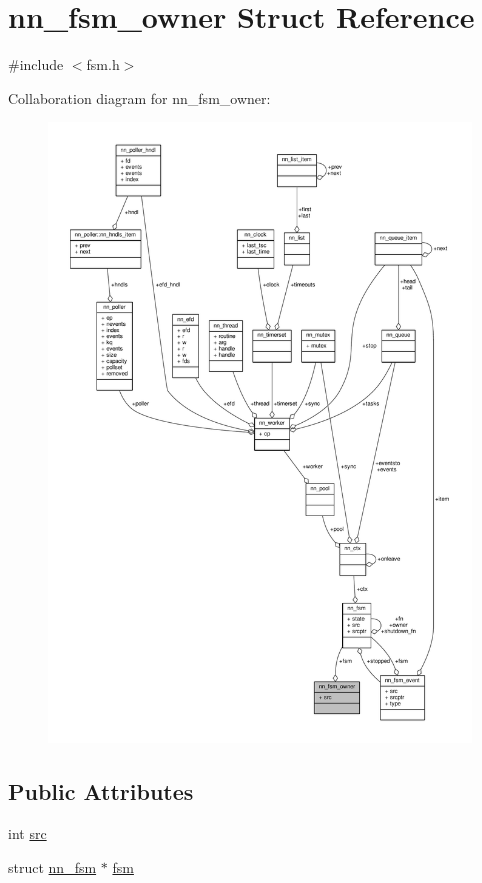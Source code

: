\hypertarget{structnn__fsm__owner}{}\section{nn\+\_\+fsm\+\_\+owner Struct Reference}
\label{structnn__fsm__owner}


{\ttfamily \#include $<$fsm.\+h$>$}



Collaboration diagram for nn\+\_\+fsm\+\_\+owner\+:\nopagebreak
\begin{figure}[H]
\begin{center}
\leavevmode
\includegraphics[width=350pt]{structnn__fsm__owner__coll__graph}
\end{center}
\end{figure}
\subsection*{Public Attributes}
\begin{DoxyCompactItemize}
\item 
int \hyperlink{structnn__fsm__owner_aab85be21a9bebaeb264d7626829c8632}{src}
\item 
struct \hyperlink{structnn__fsm}{nn\+\_\+fsm} $\ast$ \hyperlink{structnn__fsm__owner_ae05ede92ec1327579eb015bb707546b4}{fsm}
\end{DoxyCompactItemize}


